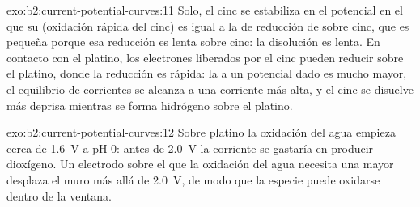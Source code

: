 \begin{solution}{exo:b2:current-potential-curves:11}
Solo, el cinc se estabiliza en el potencial en el que su  (oxidación
rápida del cinc) es igual a la  de reducción de  sobre cinc,
que es pequeña porque esa reducción es lenta sobre cinc: la disolución es
lenta. En contacto con el platino, los electrones liberados por el cinc pueden reducir 
sobre el platino, donde la reducción es rápida: la  a un potencial
dado es mucho mayor, el equilibrio de corrientes se alcanza a una corriente más alta, y el
cinc se disuelve más deprisa mientras se forma hidrógeno sobre el platino.
\end{solution}

\begin{solution}{exo:b2:current-potential-curves:12}
Sobre platino la oxidación del agua empieza cerca de \qty{1.6}{V} a pH 0: antes de
\qty{2.0}{V} la corriente se gastaría en producir dioxígeno. Un electrodo sobre el que
la oxidación del agua necesita una  mayor desplaza el muro más allá de
\qty{2.0}{V}, de modo que la especie puede oxidarse dentro de la ventana.
\end{solution}

